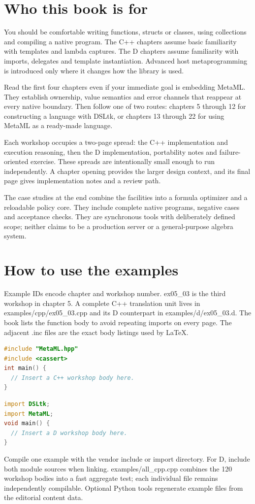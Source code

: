 \clearpage
\section*{Who this book is for}
You should be comfortable writing functions, structs or classes, using collections and compiling a native program. The C++ chapters assume basic familiarity with templates and lambda captures. The D chapters assume familiarity with imports, delegates and template instantiation. Advanced host metaprogramming is introduced only where it changes how the library is used.

Read the first four chapters even if your immediate goal is embedding MetaML. They establish ownership, value semantics and error channels that reappear at every native boundary. Then follow one of two routes: chapters 5 through 12 for constructing a language with DSLtk, or chapters 13 through 22 for using MetaML as a ready-made language.

Each workshop occupies a two-page spread: the C++ implementation and execution reasoning, then the D implementation, portability notes and failure-oriented exercise. These spreads are intentionally small enough to run independently. A chapter opening provides the larger design context, and its final page gives implementation notes and a review path.

The case studies at the end combine the facilities into a formula optimizer and a reloadable policy core. They include complete native programs, negative cases and acceptance checks. They are synchronous tools with deliberately defined scope; neither claims to be a production server or a general-purpose algebra system.

\clearpage
\section*{How to use the examples}
Example IDs encode chapter and workshop number. ex05\_03 is the third workshop in chapter 5. A complete C++ translation unit lives in examples/cpp/ex05\_03.cpp and its D counterpart in examples/d/ex05\_03.d. The book lists the function body to avoid repeating imports on every page. The adjacent .inc files are the exact body listings used by LaTeX.

\begin{lstlisting}[language=C++]
#include "MetaML.hpp"
#include <cassert>
int main() {
  // Insert a C++ workshop body here.
}
\end{lstlisting}
\begin{lstlisting}[language=D]
import DSLtk;
import MetaML;
void main() {
  // Insert a D workshop body here.
}
\end{lstlisting}
Compile one example with the vendor include or import directory. For D, include both module sources when linking. examples/all\_cpp.cpp combines the 120 workshop bodies into a fast aggregate test; each individual file remains independently compilable. Optional Python tools regenerate example files from the editorial content data.

